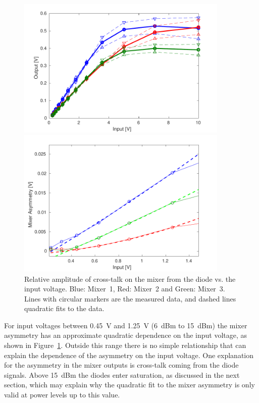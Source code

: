 \begin{figure}
  \centering
  \includegraphics[width=0.9\textwidth]{Figures/phaseMons/MixerVsVolts}
  \caption{Mixer maximum output voltage (dashed lines with upward triangle markers) and minimum output voltage (dashed lines with downward triangle markers) vs. the input voltage. Solid lines with circular markers show the average of the minimum and maximum. Blue: Mixer~1, Red: Mixer~2 and Green: Mixer~3.}
  \label{f:MixerVsVolts}
  \includegraphics[width=0.9\textwidth]{Figures/phaseMons/MixerAsymmetryVsVolts}
  \caption{Relative amplitude of cross-talk on the mixer from the diode vs. the input voltage. Blue: Mixer~1, Red: Mixer~2 and Green: Mixer~3. Lines with circular markers are the measured data, and dashed lines quadratic fits to the data.}
  \label{f:MixerAsymmetryVsVolts}
\end{figure}

For input voltages between 0.45~V and 1.25~V (6~dBm to 15~dBm) the mixer asymmetry has an approximate quadratic dependence on the input voltage, as shown in Figure~\ref{f:MixerAsymmetryVsVolts}. Outside this range there is no simple relationship that can explain the dependence of the asymmetry on the input voltage. One explanation for the asymmetry in the mixer outputs is cross-talk coming from the diode signals. Above 15~dBm the diodes enter saturation, as discussed in the next section, which may explain why the quadratic fit to the mixer asymmetry is only valid at power levels up to this value. 


